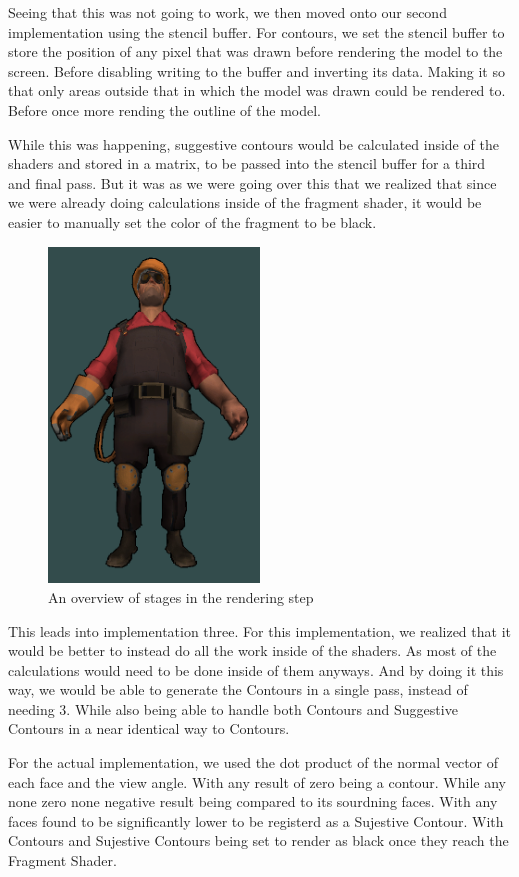 Seeing that this was not going to work, we then moved onto our second implementation using the stencil buffer. For contours, we set the stencil buffer to store the position of any pixel that was drawn before rendering the model to the screen. Before disabling writing to the buffer and inverting its data. Making it so that only areas outside that in which the model was drawn could be rendered to. Before once more rending the outline of the model.

While this was happening, suggestive contours would be calculated inside of the shaders and stored in a matrix, to be passed into the stencil buffer for a third and final pass. But it was as we were going over this that we realized that since we were already doing calculations inside of the fragment shader, it would be easier to manually set the color of the fragment to be black.

\begin{figure}[h]
    \centering
    \includegraphics[width=0.5\textwidth]{img/ModelD.png}
    \caption{An overview of stages in the rendering step}
    \label{fig-render-overview}
\end{figure}

This leads into implementation three. For this implementation, we realized that it would be better to instead do all the work inside of the shaders. As most of the calculations would need to be done inside of them anyways. And by doing it this way, we would be able to generate the Contours in a single pass, instead of needing 3. While also being able to handle both Contours and Suggestive Contours in a near identical way to Contours.

For the actual implementation, we used the dot product of the normal vector of each face and the view angle. With any result of zero being a contour. While any none zero none negative result being compared to its sourdning faces. With any faces found to be significantly lower to be registerd as a Sujestive Contour. With Contours and Sujestive Contours being set to render as black once they reach the Fragment Shader.